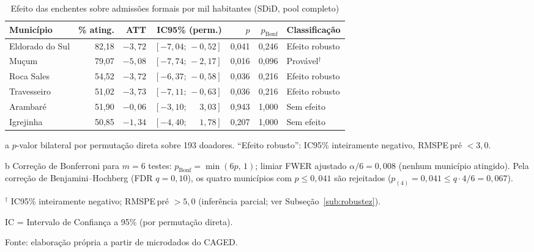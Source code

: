 \documentclass[a4paper,12pt]{article}
\begin{document}
\begin{table}[htbp]
\centering
\caption{Efeito das enchentes sobre admissões formais por mil habitantes (SDiD, pool completo)}
\label{tab:att_principal}
\begin{threeparttable}
\footnotesize
\begin{tabular}{l r r r r r l}
\toprule
Município & \% ating. & ATT & IC95\% (perm.) & $p$\tnote{a} & $p_{\text{Bonf}}$\tnote{b} & Classificação \\
\midrule
Eldorado do Sul & 82,18 & $-3{,}72$ & $[-7{,}04;\,-0{,}52]$ & 0,041 & 0,246 & Efeito robusto \\
Mu\c{c}um        & 79,07 & $-5{,}08$ & $[-7{,}74;\,-2{,}17]$ & 0,016 & 0,096 & Provável$^{\dagger}$ \\
Roca Sales      & 54,52 & $-3{,}72$ & $[-6{,}37;\,-0{,}58]$ & 0,036 & 0,216 & Efeito robusto \\
Travesseiro     & 51,02 & $-3{,}73$ & $[-7{,}11;\,-0{,}63]$ & 0,036 & 0,216 & Efeito robusto \\
Arambaré        & 51,90 & $-0{,}06$ & $[-3{,}10;\,\phantom{-}3{,}03]$ & 0,943 & 1,000 & Sem efeito \\
Igrejinha       & 50,85 & $-1{,}34$ & $[-4{,}40;\,\phantom{-}1{,}78]$ & 0,207 & 1,000 & Sem efeito \\
\bottomrule
\end{tabular}
\begin{tablenotes}[flushleft]
\footnotesize
\item[a] $p$-valor bilateral por permutação direta sobre 193 doadores. ``Efeito robusto'': IC95\% inteiramente negativo, RMSPE\,pré $< 3{,}0$.
\item[b] Correção de Bonferroni para $m = 6$ testes: $p_{\text{Bonf}} = \min(6p,\,1)$; limiar FWER ajustado $\alpha/6 = 0{,}008$ (nenhum município atingido). Pela correção de Benjamini--Hochberg (FDR $q = 0{,}10$), os quatro municípios com $p \leq 0{,}041$ são rejeitados ($p_{(4)} = 0{,}041 \leq q \cdot 4/6 = 0{,}067$).
\item $^{\dagger}$ IC95\% inteiramente negativo; RMSPE\,pré $> 5{,}0$ (inferência parcial; ver Subseção~\ref{sub:robustez}).
\item IC = Intervalo de Confiança a 95\% (por permutação direta).
\item Fonte: elaboração própria a partir de microdados do CAGED.
\end{tablenotes}
\end{threeparttable}
\end{table}
\end{document}
